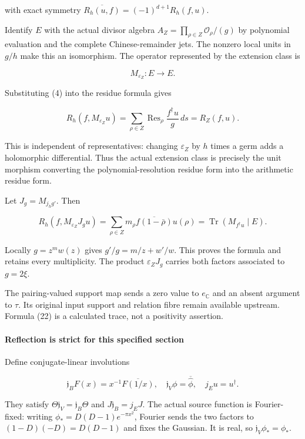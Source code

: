 with exact symmetry \(\overline{R_h(u,f)}=(-1)^{d+1}R_h(f,u)\).

Identify \(E\) with the actual divisor algebra \(A_Z=\prod_{\rho\in Z}\mathcal O_\rho/(g)\) by
polynomial evaluation and the complete Chinese-remainder jets. The nonzero local units in \(g/h\)
make this an isomorphism. The operator represented by the extension class is

\[M_{\varepsilon_Z}:E\to E.\]

Substituting (4) into the residue formula gives

\[\boxed{R_h(f,M_{\varepsilon_Z}u)
=\sum_{\rho\in Z}\operatorname{Res}_{\rho}
\frac{f^\dagger u}{g}\,ds=R_Z(f,u).}\tag{21}\]

This is independent of representatives: changing \(\varepsilon_Z\) by \(h\) times a germ adds a
holomorphic differential. Thus the actual extension class is precisely the unit morphism converting
the polynomial-resolution residue form into the arithmetic residue form.

Let \(J_g=M_{j_hg'}\). Then

\[\boxed{R_h(f,M_{\varepsilon_Z}J_gu)
=\sum_{\rho\in Z}m_\rho\overline{f(1-\bar\rho)}u(\rho)
=\operatorname{Tr}(M_{f^\dagger u}\mid E).}\tag{22}\]

Locally \(g=z^m w(z)\) gives \(g'/g=m/z+w'/w\). This proves the formula and retains every
multiplicity. The product \(\varepsilon_ZJ_g\) carries both factors associated to \(g=2\xi\).

The pairing-valued support map sends a zero value to \(e_{\mathbb C}\) and an absent argument to
\(\tau\). Its original input support and relation fibre remain available upstream. Formula (22) is a
calculated trace, not a positivity assertion.

\paragraph{Reflection is strict for this specified
section}\label{pr_9:reflection-is-strict-for-this-specified-section}

Define conjugate-linear involutions

\[\mathfrak j_BF(x)=x^{-1}\overline{F(1/x)},\quad
\mathfrak j_V\phi=\overline{\widehat\phi},\quad j_Eu=u^\dagger.\]

They satisfy \(\Theta\mathfrak j_V=\mathfrak j_B\Theta\) and \(J\mathfrak j_B=j_EJ\). The actual
source function is Fourier-fixed: writing \(\phi_*=D(D-1)e^{-\pi x^2}\), Fourier sends the two
factors to \((1-D)(-D)=D(D-1)\) and fixes the Gaussian. It is real, so
\(\mathfrak j_V\phi_*=\phi_*\).

